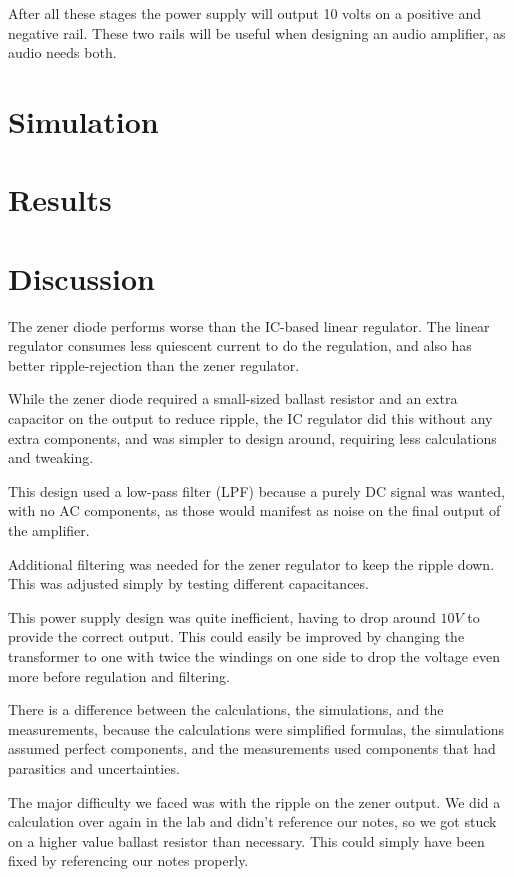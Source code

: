\documentclass[12pt]{article}
\begin{document}
After all these stages the power supply will output 10 volts on a positive and negative rail. These two rails will be useful when designing an audio amplifier, as audio needs both.

\section{Simulation}

\section{Results}


\section{Discussion}


The zener diode performs worse than the IC-based linear regulator. The linear regulator consumes less quiescent current to do the regulation,
and also has better ripple-rejection than the zener regulator.

While the zener diode required a small-sized ballast resistor and an extra capacitor on the output to reduce ripple,
the IC regulator did this without any extra components, and was simpler to design around, requiring less calculations
and tweaking.

This design used a low-pass filter (LPF) because a purely DC signal was wanted, with no
AC components, as those would manifest as noise on the final output of the amplifier.

Additional filtering was needed for the zener regulator to keep the ripple down. This was adjusted
simply by testing different capacitances.

This power supply design was quite inefficient, having to drop around $10V$ to provide the correct
output. This could easily be improved by changing the transformer to one with twice the windings on
one side to drop the voltage even more before regulation and filtering.

There is a difference between the calculations, the simulations, and the measurements, because the
calculations were simplified formulas, the simulations assumed perfect components, and the
measurements used components that had parasitics and uncertainties.

The major difficulty we faced was with the ripple on the zener output. We did a 
calculation over again in the lab and didn't reference our notes, so we got stuck
on a higher value ballast resistor than necessary. This could simply have been fixed by referencing
our notes properly.
\end{document}
